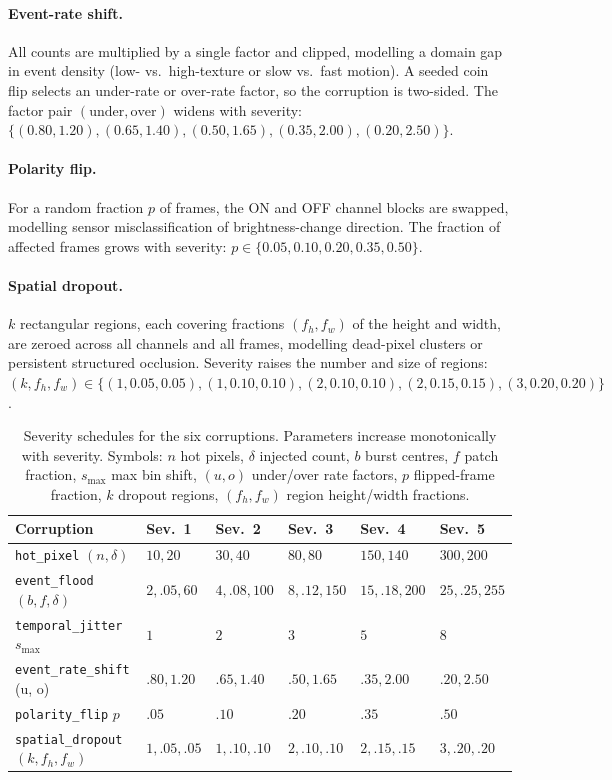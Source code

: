 \paragraph{Event-rate shift.}
All counts are multiplied by a single factor and clipped, modelling a domain gap in event
density (low- vs.\ high-texture or slow vs.\ fast motion). A seeded coin flip selects an
under-rate or over-rate factor, so the corruption is two-sided. The factor pair
$(\text{under},\text{over})$ widens with severity:
$\{(0.80,1.20),(0.65,1.40),(0.50,1.65),(0.35,2.00),(0.20,2.50)\}$.

\paragraph{Polarity flip.}
For a random fraction $p$ of frames, the ON and OFF channel blocks are swapped, modelling
sensor misclassification of brightness-change direction. The fraction of affected frames grows
with severity: $p \in \{0.05,0.10,0.20,0.35,0.50\}$.

\paragraph{Spatial dropout.}
$k$ rectangular regions, each covering fractions $(f_h, f_w)$ of the height and width, are
zeroed across all channels and all frames, modelling dead-pixel clusters or persistent
structured occlusion. Severity raises the number and size of regions:
$(k, f_h, f_w) \in \{(1,0.05,0.05),(1,0.10,0.10),(2,0.10,0.10),(2,0.15,0.15),(3,0.20,0.20)\}$.

\begin{table}[t]
  \centering
  \small
  \begin{tabularx}{\linewidth}{@{}l X X X X X@{}}
    \toprule
    Corruption & Sev.\ 1 & Sev.\ 2 & Sev.\ 3 & Sev.\ 4 & Sev.\ 5 \\
    \midrule
    \texttt{hot\_pixel} $(n,\delta)$        & $10,20$  & $30,40$  & $80,80$   & $150,140$ & $300,200$ \\
    \texttt{event\_flood} $(b,f,\delta)$    & $2,.05,60$ & $4,.08,100$ & $8,.12,150$ & $15,.18,200$ & $25,.25,255$ \\
    \texttt{temporal\_jitter} $s_{\max}$    & $1$ & $2$ & $3$ & $5$ & $8$ \\
    \texttt{event\_rate\_shift} (u, o)      & $.80,1.20$ & $.65,1.40$ & $.50,1.65$ & $.35,2.00$ & $.20,2.50$ \\
    \texttt{polarity\_flip} $p$             & $.05$ & $.10$ & $.20$ & $.35$ & $.50$ \\
    \texttt{spatial\_dropout} $(k,f_h,f_w)$ & $1,.05,.05$ & $1,.10,.10$ & $2,.10,.10$ & $2,.15,.15$ & $3,.20,.20$ \\
    \bottomrule
  \end{tabularx}
  \caption{Severity schedules for the six corruptions. Parameters increase monotonically with
  severity. Symbols: $n$ hot pixels, $\delta$ injected count, $b$ burst centres, $f$ patch
  fraction, $s_{\max}$ max bin shift, $(u,o)$ under/over rate factors, $p$ flipped-frame
  fraction, $k$ dropout regions, $(f_h,f_w)$ region height/width fractions.}
  \label{tab:corr-severity}
\end{table}

